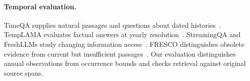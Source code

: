 \paragraph{Temporal evaluation.}
TimeQA supplies natural passages and questions about dated histories~\citep{chen2021timeqa}.
TempLAMA evaluates factual answers at yearly resolution~\citep{dhingra2022templama}.
StreamingQA and FreshLLMs study changing information access~\citep{liska2022streamingqa,vu2024freshllms}.
FRESCO distinguishes obsolete evidence from current but insufficient passages~\citep{an2026fresco}.
Our evaluation distinguishes annual observations from occurrence bounds and checks retrieval against original source spans.
